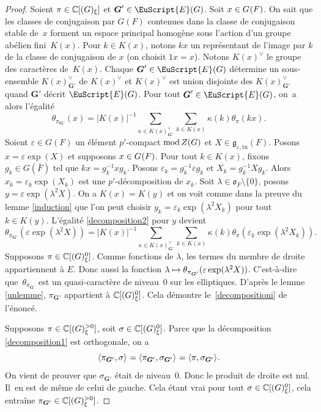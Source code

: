\documentclass[JEP,XML,SOM,Unicode,francais]{cedram}
\let\mathcal \EuScript
\newcommand{\NoChangel}[1]{%
\expandafter\let\csname old\string#1\endcsname=#1
\let#1=\relax
\newcommand{#1}{\mathcode`l="716C\csname old\string#1\endcsname\mathcode`l="7160 }%
}
\let\epsilon\varepsilon
\let\<\langle
\let\>\rangle
\newcommand\mto{\mathchoice{\longmapsto}{\mapsto}{\mapsto}{\mapsto}}
\newcommand{\rmod}{\textup{mod}\,}
\newcommand{\frg}{\mathfrak{g}}
\newcommand{\fro}{\mathfrak{o}}
\newcommand{\rell}{\mathrm{ell}} \NoChangel{\rell}
\newcommand{\Ell}{\mathrm{Ell}} \NoChangel{\Ell}
\newcommand{\tn}{\mathrm{tn}}
\newcommand{\bG}{\boldsymbol{G}}
\newcommand{\cE}{\mathcal{E}}
\newcommand{\CC}{\mathbb{C}}
\theoremstyle{plain}
\theoremstyle{definition}
\begin{document}
\begin{proof}
Soient $\pi\in \CC[\Ell(G)_{\xi}]$ et $\bG'\in \cE(G)$. Soit $x\in G_{\rell}(F)$. On sait que les classes de conjugaison par $G(F)$ contenues dans la classe de conjugaison stable de~$x$ forment un espace principal homogène sous l'action d'un groupe abélien fini~$K(x)$. Pour $k\in K(x)$, notons $kx$ un représentant de l'image par $k$ de la classe de conjugaison de $x$ (on choisit $1x=x$). Notons $K(x)^{\vee}$ le groupe des caractères de~$K(x)$. Chaque $\bG'\in \cE(G)$ détermine un sous-ensemble $K(x)^{\vee}_{\bG'}$ de $K(x)^{\vee}$ et $K(x)^{\vee}$ est union disjointe des $K(x)^{\vee}_{\bG'}$ quand $\bG'$ décrit $\cE(G)$. Pour tout $\bG'\in \cE(G)$, on~a alors l'égalité
\begin{equation}\tag{2}\label{decomposition2}
\theta_{\pi_{\bG'}}(x)=\vert K(x)\vert ^{-1}\sum_{\kappa\in K(x)^{\vee}_{\bG'}}\sum_{k\in K(x)}\kappa(k)\theta_{\pi}(kx).
\end{equation}
Soient $\epsilon\in G(F)$ un élément $p'$-compact $\rmod Z(G)$ et $X\in \frg_{\epsilon,\tn}(F)$. Posons $x=\epsilon \exp(X)$ et supposons $x\in G_{\rell}(F)$. Pour tout $k\in K(x)$, fixons $g_{k}\in G(\bar{F})$ tel que $kx=g_{k}^{-1}xg_{k}$. Posons $\epsilon_{k}=g_{k}^{-1}\epsilon g_{k}$ et $X_{k}=g_{k}^{-1} X g_{k}$. Alors $x_{k}=\epsilon_{k}\exp(X_{k})$ est une $p'$-décomposition de $x_{k}$. Soit $\lambda\in \fro_{F}\setminus\{0\}$, posons $y=\epsilon \exp(\lambda^2 X)$. On a $K(x)=K(y)$ et on voit comme dans la preuve du lemme \ref{induction} que l'on peut choisir $y_{k}=\epsilon_{k}\exp(\lambda^2 X_{k})$ pour tout $k\in K(y)$. L'égalité \eqref{decomposition2} pour $y$ devient
\[
\theta_{\pi_{\bG'}}(\epsilon \exp(\lambda^2 X))=\vert K(x)\vert ^{-1}\sum_{\kappa\in K(x)^{\vee}_{\bG'}}\sum_{k\in K(x)}\kappa(k)\theta_{\pi}(\epsilon_{k}\exp(\lambda^2 X_{k})).
\]
Supposons $\pi\in \CC[\Ell(G)^0_{\xi}]$. Comme fonctions de $\lambda$, les termes du membre de droite appartiennent à $E$. Donc aussi la fonction $\lambda\mto \theta_{\pi_{\bG'}}(\epsilon \exp(\lambda^2 X))$. C'est-à-dire que~$\theta_{\pi_{\bG'}}$ est un quasi-caractère de niveau~$0$ sur les elliptiques. D'après le lemme \ref{unlemme}, $\pi_{\bG'}$ appartient à $\CC[\Ell(G)_{\xi}^0]$. Cela démontre le~\eqref{decompositioni} de l'énoncé.

Supposons $\pi\in \CC[\Ell(G)^{>0}_{\xi}]$, soit $\sigma\in \CC[\Ell(G)^0_{\xi}]$. Parce que la décomposition \eqref{decomposition1} est orthogonale, on a
\[
\<\pi_{\bG'},\sigma\>_{\rell}=\<\pi_{\bG'},\sigma_{\bG'}\>_{\rell}=\<\pi,\sigma_{\bG'}\>_{\rell}.
\]
On vient de prouver que $\sigma_{\bG'}$ était de niveau~$0$. Donc le produit de droite est nul. Il~en est de même de celui de gauche. Cela étant vrai pour tout $\sigma\in \CC[\Ell(G)^0_{\xi}]$, cela entraîne $\pi_{\bG'}\in \CC[\Ell(G)^{>0}_{\xi}]$.
\end{proof}
\end{document}
